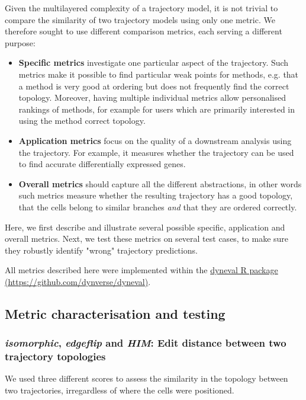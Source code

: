 Given the multilayered complexity of a trajectory model, it is not trivial to compare the similarity of two trajectory models using only one metric. We therefore sought to use different comparison metrics, each serving a different purpose:

\begin{itemize}
	\item \textbf{Specific metrics} investigate one particular aspect of the trajectory. Such metrics make it possible to find particular weak points for methods, e.g. that a method is very good at ordering but does not frequently find the correct topology. Moreover, having multiple individual metrics allow personalised rankings of methods, for example for users which are primarily interested in using the method correct topology.
	\item \textbf{Application metrics} focus on the quality of a downstream analysis using the trajectory. For example, it measures whether the trajectory can be used to find accurate differentially expressed genes.
	\item \textbf{Overall metrics} should capture all the different abstractions, in other words such metrics measure whether the resulting trajectory has a good topology, that the cells belong to similar branches \textit{and} that they are ordered correctly.
\end{itemize}

Here, we first describe and illustrate several possible specific, application and overall metrics. Next, we test these metrics on several test cases, to make sure they robustly identify "wrong" trajectory predictions.

All metrics described here were implemented within the \href{https://github.com/dynverse/dyneval}{dyneval R package (https://github.com/dynverse/dyneval)}.

\subsection{Metric characterisation and testing}

\subsubsection{\textit{isomorphic}, \textit{edgeflip} and \textit{HIM}: Edit distance between two trajectory topologies}

We used three different scores to assess the similarity in the topology between two trajectories, irregardless of where the cells were positioned.

